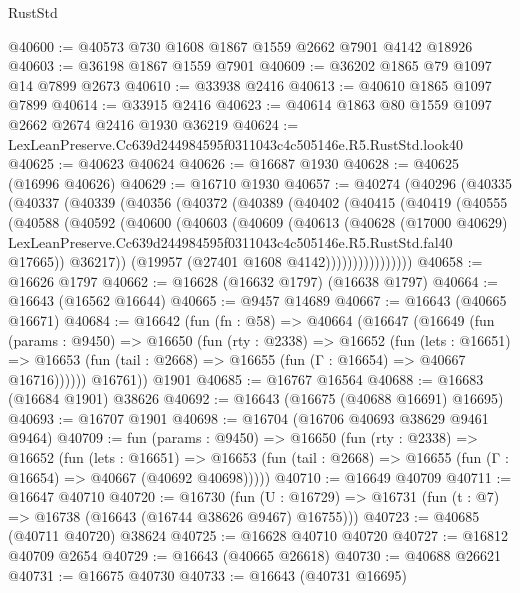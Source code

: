 \begin{lexlean}{RustStd}
\begin{coremodule}
@40600 := @40573 @730 @1608 @1867 @1559 @2662 @7901 @4142 @18926
@40603 := @36198 @1867 @1559 @7901
@40609 := @36202 @1865 @79 @1097 @14 @7899 @2673
@40610 := @33938 @2416
@40613 := @40610 @1865 @1097 @7899
@40614 := @33915 @2416
@40623 := @40614 @1863 @80 @1559 @1097 @2662 @2674 @2416 @1930 @36219
@40624 := LexLeanPreserve.Cc639d244984595f0311043c4c505146e.R5.RustStd.look40
@40625 := @40623 @40624
@40626 := @16687 @1930
@40628 := @40625 (@16996 @40626)
@40629 := @16710 @1930
@40657 := @40274
    (@40296
      (@40335
        (@40337
          (@40339
            (@40356
              (@40372
                (@40389
                  (@40402
                    (@40415
                      (@40419
                        (@40555
                          (@40588
                            (@40592
                              (@40600
                                (@40603
                                  (@40609
                                    (@40613
                                      (@40628
                                        (@17000 @40629)
                                        LexLeanPreserve.Cc639d244984595f0311043c4c505146e.R5.RustStd.fal40
                                        @17665))
                                    @36217))
                                (@19957 (@27401 @1608 @4142))))))))))))))))
@40658 := @16626 @1797
@40662 := @16628 (@16632 @1797) (@16638 @1797)
@40664 := @16643 (@16562 @16644)
@40665 := @9457 @14689
@40667 := @16643 (@40665 @16671)
@40684 := @16642
    (fun (fn : @58) =>
    @40664
      (@16647
        (@16649
          (fun (params : @9450) =>
          @16650
            (fun (rty : @2338) =>
            @16652
              (fun (lets : @16651) =>
              @16653 (fun (tail : @2668) => @16655 (fun (Γ : @16654) => @40667 @16716))))))
        @16761))
    @1901
@40685 := @16767 @16564
@40688 := @16683 (@16684 @1901) @38626
@40692 := @16643 (@16675 (@40688 @16691) @16695)
@40693 := @16707 @1901
@40698 := @16704 (@16706 @40693 @38629 @9461 @9464)
@40709 := fun (params : @9450) =>
  @16650
    (fun (rty : @2338) =>
    @16652
      (fun (lets : @16651) =>
      @16653 (fun (tail : @2668) => @16655 (fun (Γ : @16654) => @40667 (@40692 @40698)))))
@40710 := @16649 @40709
@40711 := @16647 @40710
@40720 := @16730
    (fun (U : @16729) => @16731 (fun (t : @7) => @16738 (@16643 (@16744 @38626 @9467) @16755)))
@40723 := @40685 (@40711 @40720) @38624
@40725 := @16628 @40710 @40720
@40727 := @16812 @40709 @2654
@40729 := @16643 (@40665 @26618)
@40730 := @40688 @26621
@40731 := @16675 @40730
@40733 := @16643 (@40731 @16695)

\end{coremodule}
\end{lexlean}
